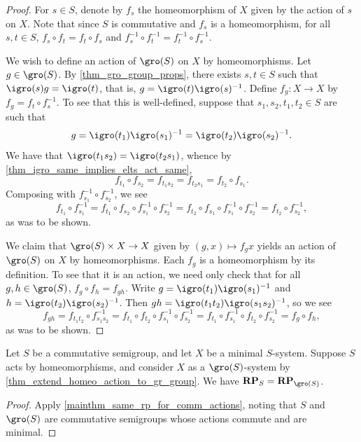 \begin{proof}
    For $s \in S$, denote by $f_s$ the homeomorphism of $X$ given by the action of $s$ on $X$. Note that since $S$ is commutative and $f_s$ is a homeomorphism, for all $s, t \in S$, $f_s \circ f_t = f_t \circ f_s$ and $f_s^{-1} \circ f_t^{-1} = f_t^{-1} \circ f_s^{-1}$.
    
    We wish to define an action of $\gro(S)$ on $X$ by homeomorphisms. Let $g \in \gro(S)$. By \cref{thm_gro_group_props}, there exists $s, t \in S$ such that $\igro(s) g = \igro(t)$, that is, $g = \igro(t) \igro(s)^{-1}$. Define $f_g: X \to X$ by $f_g = f_t \circ f_s^{-1}$.  To see that this is well-defined, suppose that $s_1, s_2, t_1, t_2 \in S$ are such that
    \[g = \igro(t_1) \igro(s_1)^{-1} = \igro(t_2) \igro(s_2)^{-1}.\]
    We have that $\igro(t_1 s_2) = \igro(t_2 s_1)$, whence by \cref{thm_igro_same_implies_elts_act_same},
    \[f_{t_1} \circ f_{s_2} = f_{t_1 s_2} = f_{t_2 s_1} = f_{t_2} \circ f_{s_1}.\]
    Composing with $f_{s_1}^{-1} \circ f_{s_2}^{-1}$, we see
    \[f_{t_1} \circ f_{s_1}^{-1} = f_{t_1} \circ f_{s_2} \circ f_{s_1}^{-1} \circ f_{s_2}^{-1} = f_{t_2} \circ f_{s_1} \circ f_{s_1}^{-1} \circ f_{s_2}^{-1} = f_{t_2} \circ f_{s_2}^{-1},\]
    as was to be shown.

    We claim that $\gro(S) \times X \to X$ given by $(g,x) \mapsto f_g x$ yields an action of $\gro(S)$ on $X$ by homeomorphisms.  Each $f_g$ is a homeomorphism by its definition. To see that it is an action, we need only check that for all $g, h \in \gro(S)$, $f_g \circ f_h = f_{gh}$.  Write $g = \igro(t_1) \igro(s_1)^{-1}$ and $h = \igro(t_2) \igro(s_2)^{-1}$.  Then $gh = \igro(t_1 t_2) \igro(s_1 s_2)^{-1}$, so we see
    \[f_{gh} = f_{t_1 t_2} \circ f_{s_1s_2}^{-1} = f_{t_1} \circ f_{t_2} \circ f_{s_1}^{-1} \circ f_{s_2}^{-1} = f_{t_1} \circ f_{s_1}^{-1} \circ f_{t_2} \circ f_{s_2}^{-1} = f_g \circ f_{h},\]
    as was to be shown.
\end{proof}

\begin{corollary}
\label{cor_S_and_GS_actions}
\leanok{}
    Let $S$ be a commutative semigroup, and let $X$ be a minimal $S$-system.  Suppose $S$ acts by homeomorphisms, and consider $X$ as a $\gro(S)$-system by \cref{thm_extend_homeo_action_to_gr_group}. We have $\RP_S = \RP_{\gro(S)}$.
\end{corollary}

\begin{proof}
    Apply \cref{mainthm_same_rp_for_comm_actions}, noting that $S$ and $\gro(S)$ are commutative semigroups whose actions commute and are minimal.
\end{proof}

